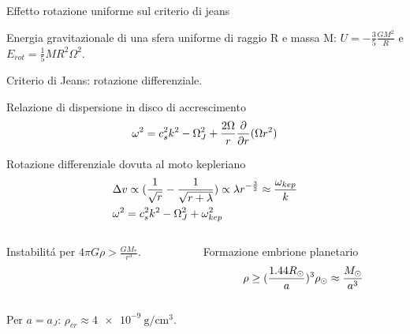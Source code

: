 \begin{wordonframe}{Effetto rotazione uniforme sul criterio di jeans}

Energia gravitazionale di una sfera uniforme di raggio R e massa M: $U=-\frac{3}{5}\frac{GM^2}{R}$ e $E_{rot}=\frac{1}{5}MR^2\Omega^2$.

\end{wordonframe}

\begin{frame}{Criterio di Jeans: rotazione differenziale.}

\begin{block}{Relazione di dispersione in disco di accrescimento}
\begin{equation*}
\omega^2=c_s^2k^2-\Omega_J^2+\frac{2\Omega}{r}\frac{\partial}{\partial r}(\Omega r^2)
\end{equation*}
\end{block}

\begin{block}{Rotazione differenziale dovuta al moto kepleriano}
\begin{align*}
&\Delta v\propto (\frac{1}{\sqrt{r}}-\frac{1}{\sqrt{r+\lambda}})\propto\lambda r^{-\frac{3}{2}}\approx\frac{\omega_{kep}}{k}\\
&\omega^2=c_s^2k^2-\Omega_J^2+\omega_{kep}^2
\end{align*}

\begin{columns}[T]

\begin{column}{0.5\textwidth}
Instabilit\'a per $4\pi G\rho>\frac{GM_*}{r^3}$.
\end{column}

\begin{column}{0.5\textwidth}
Formazione embrione planetario 
\begin{equation*}
\rho\geq(\frac{1.44R_{\odot}{}}{a})^3\rho_{\odot}\approx\frac{M_{\odot}{}}{a^3}
\end{equation*}
\end{column}

\end{columns}

Per $a=a_J$: $\rho_{cr}\approx\SI{4e-9}{\gram\per\cubic\cm}$.

\end{block}

\end{frame}

